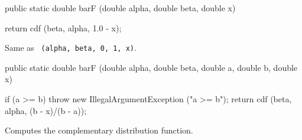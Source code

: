\begin{code}

   public static double barF (double alpha, double beta, double x)\begin{hide} {
      return cdf (beta, alpha, 1.0 - x);
   }\end{hide}
\end{code}
\begin{tabb}  Same as
 ~\texttt{(alpha, beta, 0, 1, x)}.
\end{tabb}
\begin{code}

   public static double barF (double alpha, double beta,
                              double a, double b, double x)\begin{hide} {
      if (a >= b)
         throw new IllegalArgumentException ("a >= b");
      return cdf (beta, alpha, (b - x)/(b - a));
   }\end{hide}
\end{code}
  \begin{tabb}
  Computes the complementary distribution function.
 \end{tabb}
